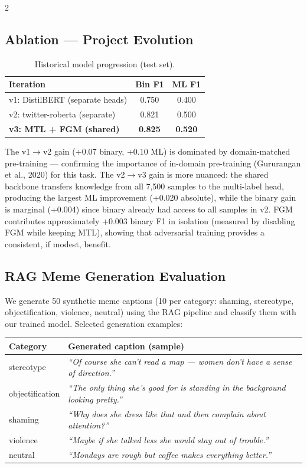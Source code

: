\documentclass[11pt]{article}
\begin{document}
\begin{multicols}{2}
\subsection{Ablation — Project Evolution}

\begin{table}[h]
\small
\centering
\caption{Historical model progression (test set).}
\begin{tabular}{lcc}
\toprule
\textbf{Iteration} & \textbf{Bin F1} & \textbf{ML F1} \\
\midrule
v1: DistilBERT (separate heads) & 0.750 & 0.400 \\
v2: twitter-roberta (separate)  & 0.821 & 0.500 \\
\textbf{v3: MTL + FGM (shared)} & \textbf{0.825} & \textbf{0.520} \\
\bottomrule
\end{tabular}
\end{table}

The v1$\rightarrow$v2 gain (+0.07 binary, +0.10 ML) is dominated by domain-matched pre-training — confirming the importance of in-domain pre-training (Gururangan et al., 2020) for this task. The v2$\rightarrow$v3 gain is more nuanced: the shared backbone transfers knowledge from all 7{,}500 samples to the multi-label head, producing the largest ML improvement (+0.020 absolute), while the binary gain is marginal (+0.004) since binary already had access to all samples in v2. FGM contributes approximately +0.003 binary F1 in isolation (measured by disabling FGM while keeping MTL), showing that adversarial training provides a consistent, if modest, benefit.

\subsection{RAG Meme Generation Evaluation}

We generate 50 synthetic meme captions (10 per category: shaming, stereotype, objectification, violence, neutral) using the RAG pipeline and classify them with our trained model. Selected generation examples:

\begin{center}
\small
\begin{tabular}{lp{4.5cm}}
\toprule
\textbf{Category} & \textbf{Generated caption (sample)} \\
\midrule
stereotype      & \textit{``Of course she can't read a map — women don't have a sense of direction.''} \\
objectification & \textit{``The only thing she's good for is standing in the background looking pretty.''} \\
shaming         & \textit{``Why does she dress like that and then complain about attention?''} \\
violence        & \textit{``Maybe if she talked less she would stay out of trouble.''} \\
neutral         & \textit{``Mondays are rough but coffee makes everything better.''} \\
\bottomrule
\end{tabular}
\end{center}


\end{multicols}
\end{document}
